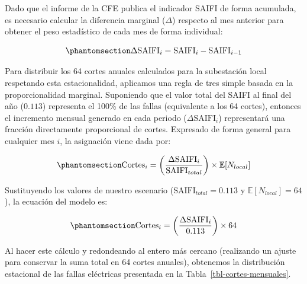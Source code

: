 \documentclass[
  spanish,
  letterpaper,
  DIV=11,
  numbers=noendperiod]{scrreprt}
\theoremstyle{plain}
\theoremstyle{plain}
\theoremstyle{plain}
\theoremstyle{definition}
\theoremstyle{remark}
\begin{document}
Dado que el informe de la CFE publica el indicador SAIFI de forma
acumulada, es necesario calcular la diferencia marginal (\(\Delta\))
respecto al mes anterior para obtener el peso estadístico de cada mes de
forma individual:

\begin{equation}\phantomsection\label{eq-delta-saifi}{
\Delta \text{SAIFI}_i = \text{SAIFI}_i - \text{SAIFI}_{i-1}
}\end{equation}

Para distribuir los 64 cortes anuales calculados para la subestación
local respetando esta estacionalidad, aplicamos una regla de tres simple
basada en la proporcionalidad marginal. Suponiendo que el valor total
del SAIFI al final del año (\(0.113\)) representa el 100\% de las fallas
(equivalente a los 64 cortes), entonces el incremento mensual generado
en cada periodo (\(\Delta \text{SAIFI}_i\)) representará una fracción
directamente proporcional de cortes. Expresado de forma general para
cualquier mes \(i\), la asignación viene dada por:

\begin{equation}\phantomsection\label{eq-reparto-cortes}{
\text{Cortes}_i = \left( \frac{\Delta \text{SAIFI}_i}{\text{SAIFI}_{total}} \right) \times \mathbb{E}[N_{local}]
}\end{equation}

Sustituyendo los valores de nuestro escenario
(\(\text{SAIFI}_{total} = 0.113\) y \(\mathbb{E}[N_{local}] = 64\)), la
ecuación del modelo es:

\begin{equation}\phantomsection\label{eq-modelo-cortes}{
\text{Cortes}_i = \left( \frac{\Delta \text{SAIFI}_i}{0.113} \right) \times 64
}\end{equation}

Al hacer este cálculo y redondeando al entero más cercano (realizando un
ajuste para conservar la suma total en 64 cortes anuales), obtenemos la
distribución estacional de las fallas eléctricas presentada en la
Tabla~\ref{tbl-cortes-mensuales}.
\end{document}

